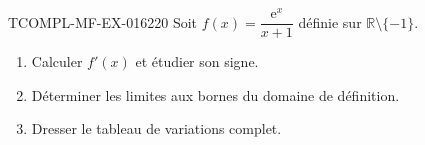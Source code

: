 \begin{exercice}{TCOMPL-MF-EX-016}{2}{20}
Soit $f(x) = \dfrac{\mathrm{e}^x}{x+1}$ définie sur $\mathbb{R} \setminus \{-1\}$.
\begin{enumerate}
  \item Calculer $f'(x)$ et étudier son signe.
  \item Déterminer les limites aux bornes du domaine de définition.
  \item Dresser le tableau de variations complet.
\end{enumerate}

\end{exercice}

